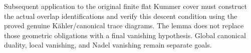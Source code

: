Subsequent application to the original finite flat Kummer cover must
construct the actual overlap identifications and verify this descent
condition using the proved genuine K\"ahler/canonical trace diagrams.
The lemma does not replace those geometric obligations with a final
vanishing hypothesis.  Global canonical duality, local vanishing,
and Nadel vanishing remain separate goals.
